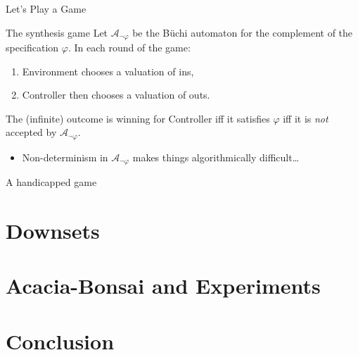 \documentclass[aspectratio=169]{beamer}
\begin{document}
\begin{frame}{Let's Play a Game}
  \begin{block}{The synthesis game}
    Let $\mathcal{A}_{\lnot \varphi}$ be the B\"uchi automaton for the
    complement of the specification $\varphi$. In each round of the game:
    \begin{enumerate}
      \item Environment chooses a valuation of ins,
      \item Controller then chooses a valuation of outs.
    \end{enumerate}
    The (infinite) outcome is \alert{winning for Controller} iff it
    satisfies $\varphi$ iff it is \emph{not} accepted by $\mathcal{A}_{\lnot
    \varphi}$.
    \begin{itemize}
      \item Non-determinism in $\mathcal{A}_{\lnot \varphi}$ makes things
        algorithmically difficult\dots
    \end{itemize}
  \end{block}
  \pause
  \begin{block}{A handicapped game}
  \end{block}
\end{frame}

\section{Downsets}

\section{Acacia-Bonsai and Experiments}

\section{Conclusion}
\end{document}
